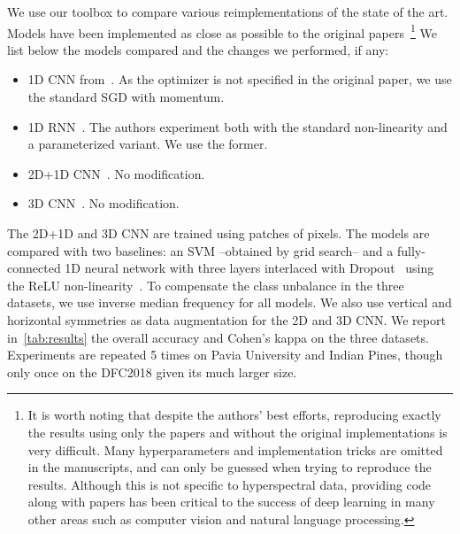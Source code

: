 \documentclass[journal]{IEEEtran}
\begin{document}
We use our toolbox to compare various reimplementations of the state of the art. Models have been implemented as close as possible to the original papers~\footnote{It is worth noting that despite the authors' best efforts, reproducing exactly the results using only the papers and without the original implementations is very difficult. Many hyperparameters and implementation tricks are omitted in the manuscripts, and can only be guessed when trying to reproduce the results. Although this is not specific to hyperspectral data, providing code along with papers has been critical to the success of deep learning in many other areas such as computer vision and natural language processing.} We list below the models compared and the changes we performed, if any:
\begin{itemize}
	\item 1D CNN from~\cite{hu_deep_2015}. As the optimizer is not specified in the original paper, we use the standard SGD with momentum.
    \item 1D RNN~\cite{mou_deep_2017}. The authors experiment both with the standard  non-linearity and a parameterized variant. We use the former.
    \item 2D+1D CNN~\cite{ben_hamida_deep_2016}. No modification.
    \item 3D CNN~\cite{li_spectralspatial_2017}. No modification.
\end{itemize}
The 2D+1D and 3D CNN are trained using patches of  pixels. The models are compared with two baselines: an SVM --obtained by grid search-- and a fully-connected 1D neural network with three layers interlaced with Dropout~\cite{srivastava_dropout:_2014} using the ReLU non-linearity~\cite{nair_rectified_2010}. To compensate the class unbalance in the three datasets, we use inverse median frequency for all models. We also use vertical and horizontal symmetries as data augmentation for the 2D and 3D CNN. We report in~\cref{tab:results} the overall accuracy and Cohen's kappa on the three datasets. Experiments are repeated 5 times on Pavia University and Indian Pines, though only once on the DFC2018 given its much larger size.
\end{document}
